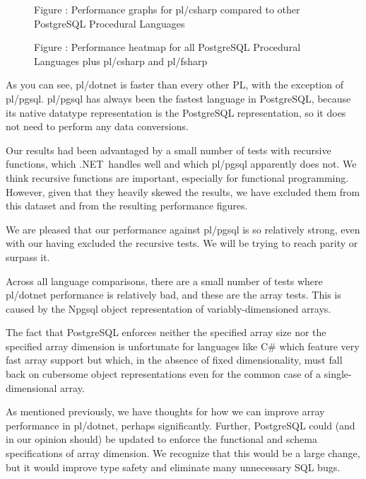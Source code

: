 \documentclass[sigconf,techreport,authorversion,nonacm]{acmart}
\newcommand{\dotnet}{.NET}
\begin{document}
\begin{figure*}[!htbp]
        \centering
        \caption{\centering Figure \thefigure: Performance graphs for pl/csharp compared to other PostgreSQL Procedural Languages}
        \label{fig:comparison}
\end{figure*}

\begin{figure*}[!htbp]
        \centering
        \caption{\centering Figure \thefigure: Performance heatmap for all PostgreSQL Procedural Languages plus pl/csharp and pl/fsharp}
        \label{fig:heatmap}
\end{figure*}

As you can see, pl/dotnet is faster than every other PL, with the
exception of pl/pgsql. pl/pgsql has always been the fastest language
in PostgreSQL, because its native datatype representation is the
PostgreSQL representation, so it does not need to perform any data
conversions.

Our results had been advantaged by a small number of tests with
recursive functions, which \dotnet\ handles well and which pl/pgsql
apparently does not.  We think recursive functions are important,
especially for functional programming.  However, given that they
heavily skewed the results, we have excluded them from this dataset
and from the resulting performance figures.

We are pleased that our performance against pl/pgsql is so relatively
strong, even with our having excluded the recursive tests.  We will
be trying to reach parity or surpass it.

Across all language comparisons, there are a small number of tests
where pl/dotnet performance is relatively bad, and these are the
array tests. This is caused by the Npgsql object representation of
variably-dimensioned arrays.

The fact that PostgreSQL enforces neither the specified array size
nor the specified array dimension is unfortunate for languages
like C\# which feature very fast array support but which, in the
absence of fixed dimensionality, must fall back on cubersome object
representations even for the common case of a single-dimensional
array.

As mentioned previously, we have thoughts for how we can improve
array performance in pl/dotnet, perhaps significantly. Further,
PostgreSQL could (and in our opinion should) be updated to enforce
the functional and schema specifications of array dimension. We
recognize that this would be a large change, but it would improve
type safety and eliminate many unnecessary SQL bugs.
\end{document}
